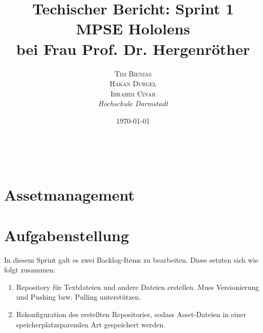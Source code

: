 \documentclass[a4paper, 11pt]{article} %
\title{\textbf{Techischer Bericht: Sprint 1}\\ %
MPSE Hololens\\ bei Frau Prof. Dr. Hergenröther} %
\author{\textsc{Tim Bienias \\ Hakan Durgel \\ Ibrahim Cinar} %
\\{\textit{Hochschule Darmstadt}}} %
\date{\today} %
\makeatletter
\renewcommand{\maketitle}{ %
\begin{flushright} %
{\LARGE\@title} %

\vspace{50pt} %

{\large\@author} %
\\\@date %

\vspace{40pt} %
\end{flushright}
}
\makeatother
\begin{document}


\maketitle %






\section*{Assetmanagement}

\section*{Aufgabenstellung}
In diesem Sprint galt es zwei Backlog-Items zu bearbeiten. Diese setzten sich wie folgt zusammen:
\begin{enumerate}
    \item Repository für Textdateien und andere Dateien erstellen. Muss Versionierung und Pushing bzw. Pulling
    unterstützen.
    \item Rekonfiguration des erstellten Repositories, sodass Asset-Dateien in einer speicherplatzsparenden Art 
    gespeichert werden.
\end{enumerate}
\end{document}
